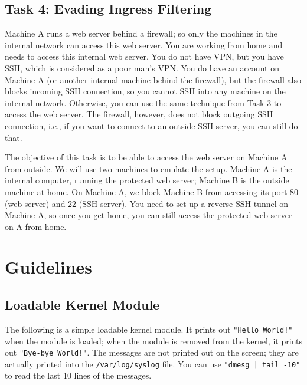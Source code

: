 \subsection{Task 4: Evading Ingress Filtering}


Machine A runs a web server behind a firewall; so only the machines 
in the internal network can access this web server. 
You are working from home and needs to access this internal web server. 
You do not have VPN, but you have SSH, which is considered as 
a poor man's VPN. You do have an account on Machine A (or another internal machine behind the firewall), 
but the firewall also blocks incoming SSH connection, so you cannot SSH into any machine on the
internal network. Otherwise, you can use the same technique from Task 3 to access the web server. 
The firewall, however, does not block outgoing SSH connection, i.e., 
if you want to connect to an outside SSH server, you can still do that. 


The objective of this task is to be able to access the web server on Machine A from
outside.  We will use two machines to emulate the setup. Machine A is the internal computer,
running the protected web server; Machine B is the outside machine at home. 
On Machine A, we block Machine B from accessing its port 80 (web server) and 22 (SSH server).
You need to set up a reverse SSH tunnel on Machine A, so once you get home, you can 
still access the protected web server on A from home. 




\section{Guidelines}
\label{firewall:sec:guidelines}


\subsection{Loadable Kernel Module}

The following is a simple loadable kernel module. It prints out 
\texttt{"Hello World!"} when the module is loaded; when the module
is removed from the kernel, it prints out \texttt{"Bye-bye World!"}.
The messages are not printed out on the screen; they are 
actually printed into the \texttt{/var/log/syslog} file. You can
use \texttt{"dmesg | tail -10"} to read the last 10 lines of 
the messages. 


